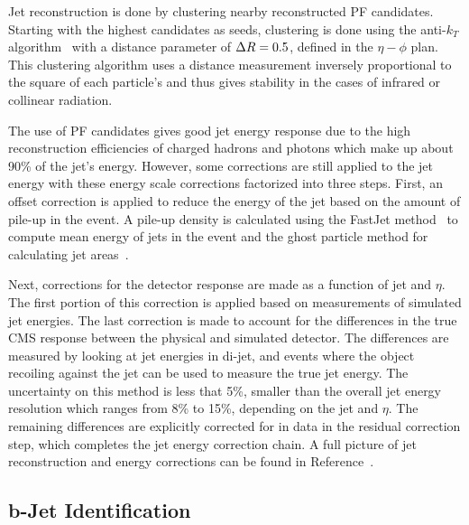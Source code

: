 Jet reconstruction is done by clustering nearby reconstructed PF
candidates. Starting with the highest \pt candidates as seeds, clustering is
done using the anti-$k_T$ algorithm~\cite{antikt} with a distance parameter of
$\Delta R=0.5$, defined in the $\eta-\phi$ plan. This clustering algorithm
uses a distance measurement inversely proportional to the square of each
particle's \pt and thus gives stability in the cases of infrared or collinear
radiation.

The use of PF candidates gives good jet energy response due to the high
reconstruction efficiencies of charged hadrons and photons which make up about
90\% of the jet's energy. However, some corrections are still applied to 
the jet energy with these energy scale corrections factorized into three steps.
First, an offset correction is applied to reduce the energy of the jet based on
the amount of pile-up in the event. A pile-up density is calculated using the
FastJet method~\cite{fastjet} to compute mean energy of jets in the event and
the ghost particle method for calculating jet areas~\cite{jetarea}.

Next, corrections for the detector response are made as a function of jet
\pt and $\eta$. The first portion of this correction is applied based on
measurements of simulated jet energies. The last correction is made to account
for the differences in the true CMS response between the physical and simulated
detector. The differences are measured by looking at jet energies in di-jet,
\gj and \Zj events where the object recoiling against the jet can be used to
measure the true jet energy. The uncertainty on this method is less that 5\%,
smaller than the overall jet energy resolution which ranges from 8\% to 15\%,
depending on the jet \pt and $\eta$. The remaining differences are explicitly
corrected for in data in the residual correction step, which completes the
jet energy correction chain. A full picture of jet reconstruction and energy
corrections can be found in Reference~\cite{cmsjetcal}.

\subsection{b-Jet Identification}                       \label {sec:cms_btags}

